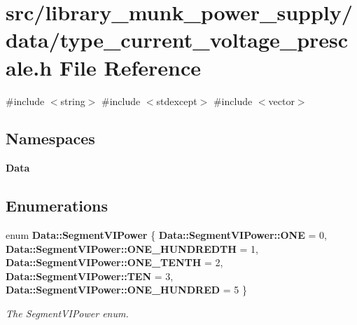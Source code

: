 \section{src/library\+\_\+munk\+\_\+power\+\_\+supply/data/type\+\_\+current\+\_\+voltage\+\_\+prescale.h File Reference}
\label{type__current__voltage__prescale_8h}
{\ttfamily \#include $<$string$>$}\newline
{\ttfamily \#include $<$stdexcept$>$}\newline
{\ttfamily \#include $<$vector$>$}\newline
\subsection*{Namespaces}
\begin{DoxyCompactItemize}
\item 
 \textbf{ Data}
\end{DoxyCompactItemize}
\subsection*{Enumerations}
\begin{DoxyCompactItemize}
\item 
enum \textbf{ Data\+::\+Segment\+V\+I\+Power} \{ \newline
\textbf{ Data\+::\+Segment\+V\+I\+Power\+::\+O\+NE} = 0, 
\textbf{ Data\+::\+Segment\+V\+I\+Power\+::\+O\+N\+E\+\_\+\+H\+U\+N\+D\+R\+E\+D\+TH} = 1, 
\textbf{ Data\+::\+Segment\+V\+I\+Power\+::\+O\+N\+E\+\_\+\+T\+E\+N\+TH} = 2, 
\textbf{ Data\+::\+Segment\+V\+I\+Power\+::\+T\+EN} = 3, 
\newline
\textbf{ Data\+::\+Segment\+V\+I\+Power\+::\+O\+N\+E\+\_\+\+H\+U\+N\+D\+R\+ED} = 5
 \}\begin{DoxyCompactList}\small\item\em The Segment\+V\+I\+Power enum. \end{DoxyCompactList}
\end{DoxyCompactItemize}
